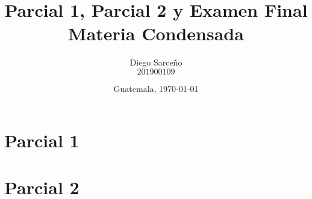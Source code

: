 





\title{\sc Parcial 1, Parcial 2 y Examen Final \\ \footnotesize{Materia Condensada}}%
\author{Diego Sarceño \\ $201900109$}
\date{Guatemala, \today}

  
\maketitle



\section{Parcial 1}
\label{sec:parcial1}
	




\section{Parcial 2}
\label{sec:parcial2}

